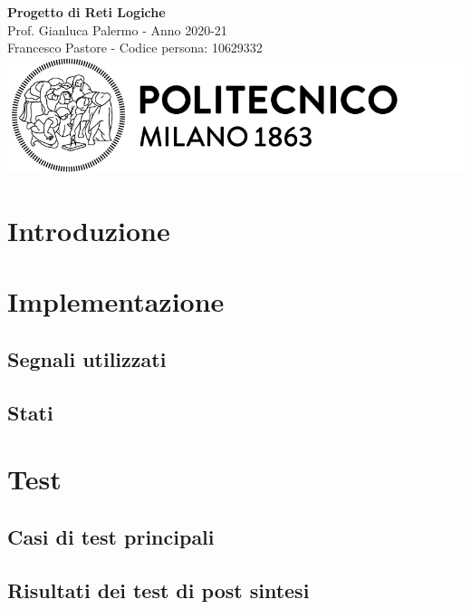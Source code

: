 \documentclass{article}
\begin{document}
\begin{titlepage}
    \centering
    \vspace*{\fill}
    \Huge\textbf{Progetto di Reti Logiche}\\
    \vspace{5mm} %
    \Large Prof. Gianluca Palermo - Anno 2020-21\\
    \vspace{5mm} %
    \large Francesco Pastore - Codice persona: 10629332\\
    \vspace{100mm}
    \includegraphics[scale=0.5]{logo.png}
    \vspace*{\fill}
\end{titlepage}

\tableofcontents
\pagebreak

\section{Introduzione}

\section{Implementazione}

\subsection{Segnali utilizzati}
\subsection{Stati}

\section{Test}
\subsection{Casi di test principali}
\subsection{Risultati dei test di post sintesi}
\end{document}
